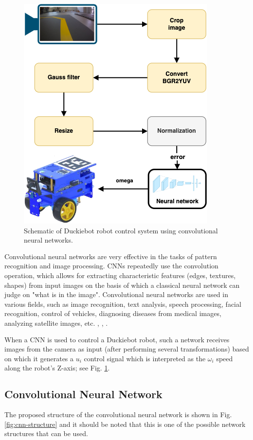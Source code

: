 \documentclass[conference]{IEEEtran}
\begin{document}
\begin{figure}[h]
    \centering
    \includegraphics[width=.8\columnwidth]{NNPipeline3}
    \caption{Schematic of Duckiebot robot control system using convolutional neural networks.}
    \label{fig:cnn-pipeline}
\end{figure}

Convolutional neural networks are very effective in the tasks of pattern recognition and image processing. CNNs repeatedly use the convolution operation, which allows for extracting characteristic features (edges, textures, shapes) from input images on the basis of which a classical neural network can judge on "what is in the image". Convolutional neural networks are used in various fields, such as image recognition, text analysis, speech processing, facial recognition, control of vehicles, diagnosing diseases from medical images, analyzing satellite images, etc. \cite{li2021survey}, \cite{rawat2017deep}, \cite{almasi2020robust}.

When a CNN is used to control a Duckiebot robot, such a network receives images from the camera as input (after performing several transformations) based on which it generates a $u_i$ control signal which is interpreted as the $\omega_i$ speed along the robot's Z-axis; see Fig. \ref{fig:cnn-pipeline}.

\subsection{Convolutional Neural Network}
The proposed structure of the convolutional neural network is shown in Fig. \ref{fig:cnn-structure} and it should be noted that this is one of the possible network structures that can be used.
\end{document}
